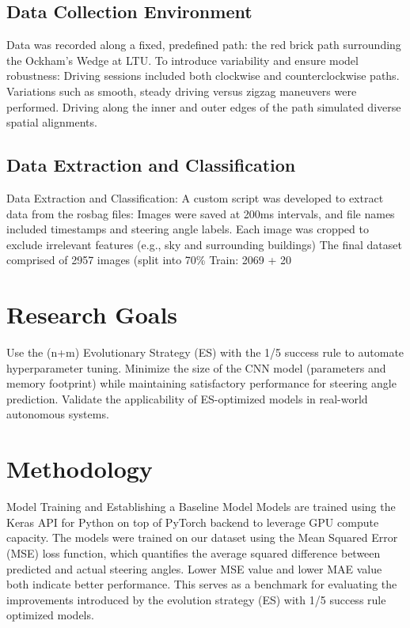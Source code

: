 \documentclass[conference]{IEEEtran}
\begin{document}
\subsection{Data Collection Environment}
Data was recorded along a fixed, predefined path: the red brick path surrounding the Ockham’s Wedge at LTU. To introduce variability and ensure model robustness:
Driving sessions included both clockwise and counterclockwise paths.
Variations such as smooth, steady driving versus zigzag maneuvers were performed.
Driving along the inner and outer edges of the path simulated diverse spatial alignments.

\subsection{Data Extraction and Classification}
Data Extraction and Classification: A custom script was developed to extract data from the rosbag files:
Images were saved at 200ms intervals, and file names included timestamps and steering angle labels.
Each image was cropped to exclude irrelevant features (e.g., sky and surrounding buildings)
The final dataset comprised of 2957 images (split into 70\% Train: 2069 + 20%


\section{Research Goals}
Use the (n+m) Evolutionary Strategy (ES) with the 1/5 success rule to automate hyperparameter tuning.
Minimize the size of the CNN model (parameters and memory footprint) while maintaining satisfactory performance for steering angle prediction.
Validate the applicability of ES-optimized models in real-world autonomous systems.

\section{Methodology}

Model Training and Establishing a Baseline Model
Models are trained using the Keras API for Python on top of PyTorch backend to leverage GPU compute capacity. The models were trained on our dataset using the Mean Squared Error (MSE) loss function, which quantifies the average squared difference between predicted and actual steering angles. Lower MSE value and lower MAE value both indicate better performance. This serves as a benchmark for evaluating the improvements introduced by the evolution strategy (ES) with 1/5 success rule optimized models.
\end{document}
